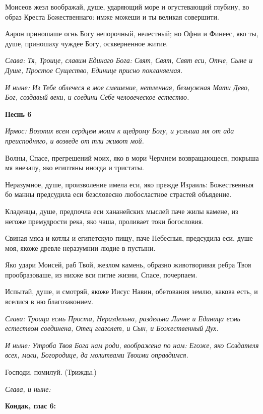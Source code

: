 Моисеов жезл воображай, душе, ударяющий море и огустевающий глубину, во образ Креста Божественнаго: имже можеши и ты великая совершити. 

Аарон приношаше огнь Богу непорочный, нелестный; но Офни и Финеес, яко ты, душе, приношаху чуждее Богу, оскверненное житие. 

\itshape Слава\normalfont{}: Тя, Троице, славим Единаго Бога: Свят, Свят, Свят еси, Отче, Сыне и Душе, Простое Существо, Единице присно покланяемая. 

\itshape И ныне\normalfont{}: Из Тебе облечеся в мое смешение, нетленная, безмужная Мати Дево, Бог, создавый веки, и соедини Себе человеческое естество. 

\medskip\bfseries Песнь 6\normalfont{}

\itshape Ирмос\normalfont{}: Возопих всем сердцем моим к щедрому Богу, и услыша мя от ада преисподняго, и возведе от тли живот мой. 

Волны, Спасе, прегрешений моих, яко в мори Чермнем возвращающеся, покрыша мя внезапу, яко египтяны иногда и тристаты. 

Неразумное, душе, произволение имела еси, яко прежде Израиль: Божественныя бо манны предсудила еси безсловесно любосластное страстей объядение. 

Кладенцы, душе, предпочла еси хананейских мыслей паче жилы камене, из негоже премудрости река, яко чаша, проливает токи богословия. 

Свиная мяса и котлы и египетскую пищу, паче Небесныя, предсудила еси, душе моя, якоже древле неразумнии людие в пустыни. 

Яко удари Моисей, раб Твой, жезлом камень, образно животворивая ребра Твоя прообразоваше, из нихже вси питие жизни, Спасе, почерпаем. 

Испытай, душе, и смотряй, якоже Иисус Навин, обетования землю, какова есть, и вселися в ню благозаконием. 

\itshape Слава\normalfont{}: Троица есмь Проста, Нераздельна, раздельна Личне и Единица есмь естеством соединена, Отец глаголет, и Сын, и Божественный Дух. 

\itshape И ныне\normalfont{}: Утроба Твоя Бога нам роди, воображена по нам: Егоже, яко Создателя всех, моли, Богородице, да молитвами Твоими оправдимся. 

Господи, помилуй. (Трижды.) 

\itshape Слава, и ныне\normalfont{}: 

\medskip\bfseries Кондак, глас 6: \normalfont{}

